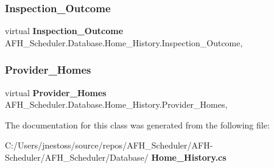 \subsubsection{Inspection\_Outcome}
{\footnotesize\ttfamily virtual \textbf{ Inspection\+\_\+\+Outcome} A\+F\+H\+\_\+\+Scheduler.\+Database.\+Home\+\_\+\+History.\+Inspection\+\_\+\+Outcome\hspace{0.3cm}{\ttfamily [get]}, {\ttfamily [set]}}

\mbox{\label{class_a_f_h___scheduler_1_1_database_1_1_home___history_a8438082e5d2fd9d8b9484d9269b9ca67}} 
\subsubsection{Provider\_Homes}
{\footnotesize\ttfamily virtual \textbf{ Provider\+\_\+\+Homes} A\+F\+H\+\_\+\+Scheduler.\+Database.\+Home\+\_\+\+History.\+Provider\+\_\+\+Homes\hspace{0.3cm}{\ttfamily [get]}, {\ttfamily [set]}}



The documentation for this class was generated from the following file\+:\begin{DoxyCompactItemize}
\item 
C\+:/\+Users/jnestoss/source/repos/\+A\+F\+H\+\_\+\+Scheduler/\+A\+F\+H-\/\+Scheduler/\+A\+F\+H\+\_\+\+Scheduler/\+Database/\textbf{ Home\+\_\+\+History.\+cs}\end{DoxyCompactItemize}
